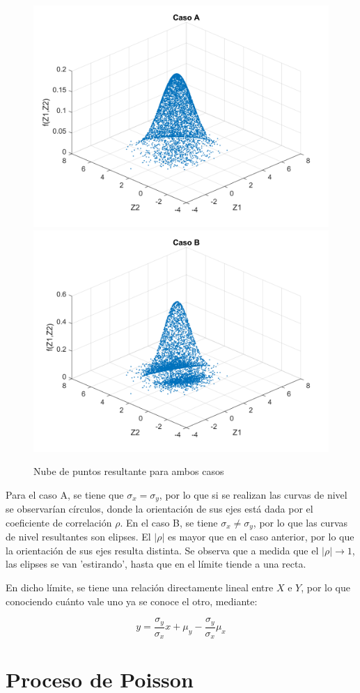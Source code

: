 \begin{figure}[!ht]
\begin{centering}
\includegraphics[scale=0.55]{Imagenes/Za.png}
\includegraphics[scale=0.55]{Imagenes/Zb.png}
\par\end{centering}
\caption{Nube de puntos resultante para ambos casos}

\end{figure} 

Para el caso A, se tiene que $\sigma_x = \sigma_y$, por lo que si se realizan las curvas de nivel se observar\'ian c\'irculos, donde la orientaci\'on de sus ejes est\'a dada por el coeficiente de correlaci\'on $\rho$. En el caso B, se tiene $\sigma_x \neq \sigma_y$, por lo que las curvas de nivel resultantes son elipses. El $|\rho|$ es mayor que en el caso anterior, por lo que la orientaci\'on de sus ejes resulta distinta. Se observa que a medida que el $|\rho| \longrightarrow 1$, las elipses se van 'estirando', hasta que en el l\'imite tiende a una recta.\par
En dicho l\'imite, se tiene una relaci\'on directamente lineal entre $X$ e $Y$, por lo que conociendo cu\'anto vale uno ya se conoce el otro, mediante:

\[
y = \frac{\sigma_y}{\sigma_x}x + \mu_y - \frac{\sigma_y}{\sigma_x} \mu_x
\] 

\newpage

\section{Proceso de Poisson}

